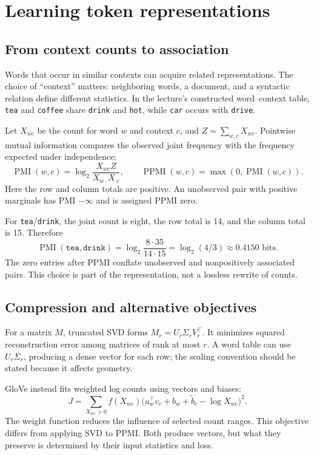 \clearpage
\section{Learning token representations}\label{sec:embeddings}
\subsection*{From context counts to association}
Words that occur in similar contexts can acquire related representations.
The choice of ``context'' matters: neighboring words, a document, and a
syntactic relation define different statistics. In the lecture's constructed
word--context table, \texttt{tea} and \texttt{coffee} share \texttt{drink}
and \texttt{hot}, while \texttt{car} occurs with \texttt{drive}.

Let $X_{wc}$ be the count for word $w$ and context $c$, and
$Z=\sum_{w,c}X_{wc}$. Pointwise mutual information compares the observed
joint frequency with the frequency expected under independence:
\[
 \operatorname{PMI}(w,c)=\log_2\frac{X_{wc}Z}{X_{w\cdot}X_{\cdot c}},\qquad
 \operatorname{PPMI}(w,c)=\max(0,\operatorname{PMI}(w,c)).
\]
Here the row and column totals are positive. An unobserved pair with positive
marginals has PMI $-\infty$ and is assigned PPMI zero.


For \texttt{tea}/\texttt{drink}, the joint count is eight, the row total is
14, and the column total is 15. Therefore
\[
 \operatorname{PMI}(\texttt{tea},\texttt{drink})
 =\log_2\frac{8\cdot35}{14\cdot15}
 =\log_2(4/3)\approx0.4150\text{ bits}.
\]
The zero entries after PPMI conflate unobserved and nonpositively associated
pairs. This choice is part of the representation, not a lossless rewrite of counts.

\subsection*{Compression and alternative objectives}
For a matrix $M$, truncated SVD forms $M_r=U_r\Sigma_rV_r^\top$.
It minimizes squared reconstruction error among matrices of rank at most
$r$. A word table can use $U_r\Sigma_r$, producing a dense vector for each
row; the scaling convention should be stated because it affects geometry.

GloVe instead fits weighted log counts using vectors and biases:
\[
 J=\sum_{X_{wc}>0}f(X_{wc})
 \bigl(u_w^\top v_c+b_w+\widetilde b_c-\log X_{wc}\bigr)^2.
\]
The weight function reduces the influence of selected count ranges.
This objective differs from applying SVD to PPMI. Both produce vectors,
but what they preserve is determined by their input statistics and loss.

